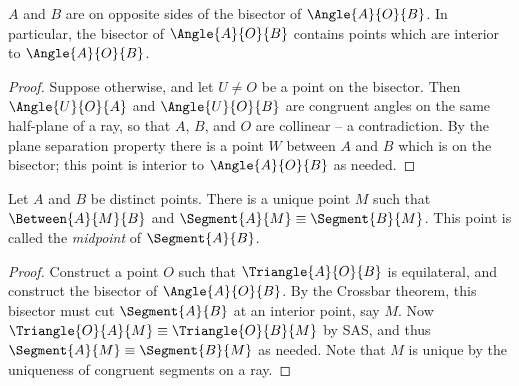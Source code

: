 \documentclass{article}
\begin{document}
\begin{cor}
$A$ and $B$ are on opposite sides of the bisector of $\Angle{A}{O}{B}$. In particular, the bisector of $\Angle{A}{O}{B}$ contains points which are interior to $\Angle{A}{O}{B}$.
\end{cor}

\begin{proof}
Suppose otherwise, and let $U \neq O$ be a point on the bisector. Then $\Angle{U}{O}{A}$ and $\Angle{U}{O}{B}$ are congruent angles on the same half-plane of a ray, so that $A$, $B$, and $O$ are collinear -- a contradiction. By the plane separation property there is a point $W$ between $A$ and $B$ which is on the bisector; this point is interior to $\Angle{A}{O}{B}$ as needed.
\end{proof}

\begin{construct}
Let $A$ and $B$ be distinct points. There is a unique point $M$ such that $\Between{A}{M}{B}$ and $\Segment{A}{M} \equiv \Segment{B}{M}$. This point is called the \emph{midpoint} of $\Segment{A}{B}$.
\end{construct}

\begin{proof}
Construct a point $O$ such that $\Triangle{A}{O}{B}$ is equilateral, and construct the bisector of $\Angle{A}{O}{B}$. By the Crossbar theorem, this bisector must cut $\Segment{A}{B}$ at an interior point, say $M$. Now $\Triangle{O}{A}{M} \equiv \Triangle{O}{B}{M}$ by SAS, and thus $\Segment{A}{M} \equiv \Segment{B}{M}$ as needed. Note that $M$ is unique by the uniqueness of congruent segments on a ray.
\end{proof}
\end{document}
